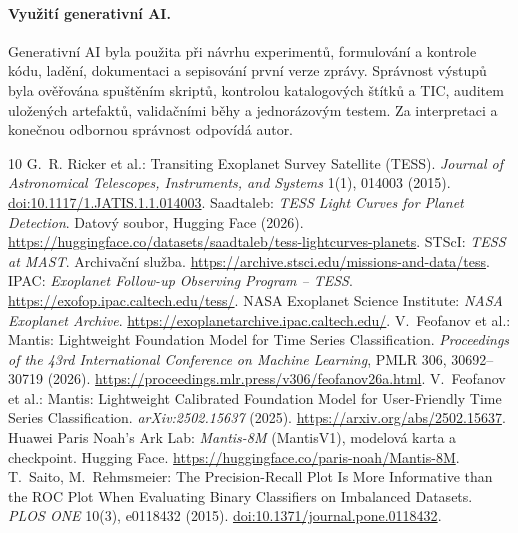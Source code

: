 \documentclass[11pt,a4paper]{article}
\begin{document}
\paragraph{Využití generativní AI.} Generativní AI byla použita při návrhu experimentů, formulování a kontrole kódu, ladění, dokumentaci a sepisování první verze zprávy. Správnost výstupů byla ověřována spuštěním skriptů, kontrolou katalogových štítků a TIC, auditem uložených artefaktů, validačními běhy a jednorázovým testem. Za interpretaci a konečnou odbornou správnost odpovídá autor.

\vspace{-2pt}
\begin{thebibliography}{10}
\small
\setlength{\itemsep}{1pt}
 G.~R. Ricker et al.: Transiting Exoplanet Survey Satellite (TESS). \emph{Journal of Astronomical Telescopes, Instruments, and Systems} 1(1), 014003 (2015). \href{https://doi.org/10.1117/1.JATIS.1.1.014003}{doi:10.1117/1.JATIS.1.1.014003}.
 Saadtaleb: \emph{TESS Light Curves for Planet Detection}. Datový soubor, Hugging Face (2026). \url{https://huggingface.co/datasets/saadtaleb/tess-lightcurves-planets}.
 STScI: \emph{TESS at MAST}. Archivační služba. \url{https://archive.stsci.edu/missions-and-data/tess}.
 IPAC: \emph{Exoplanet Follow-up Observing Program -- TESS}. \url{https://exofop.ipac.caltech.edu/tess/}.
 NASA Exoplanet Science Institute: \emph{NASA Exoplanet Archive}. \url{https://exoplanetarchive.ipac.caltech.edu/}.
 V.~Feofanov et al.: Mantis: Lightweight Foundation Model for Time Series Classification. \emph{Proceedings of the 43rd International Conference on Machine Learning}, PMLR 306, 30692--30719 (2026). \url{https://proceedings.mlr.press/v306/feofanov26a.html}.
 V.~Feofanov et al.: Mantis: Lightweight Calibrated Foundation Model for User-Friendly Time Series Classification. \emph{arXiv:2502.15637} (2025). \url{https://arxiv.org/abs/2502.15637}.
 Huawei Paris Noah's Ark Lab: \emph{Mantis-8M} (MantisV1), modelová karta a checkpoint. Hugging Face. \url{https://huggingface.co/paris-noah/Mantis-8M}.
 T.~Saito, M.~Rehmsmeier: The Precision-Recall Plot Is More Informative than the ROC Plot When Evaluating Binary Classifiers on Imbalanced Datasets. \emph{PLOS ONE} 10(3), e0118432 (2015). \href{https://doi.org/10.1371/journal.pone.0118432}{doi:10.1371/journal.pone.0118432}.
\end{thebibliography}
\end{document}
